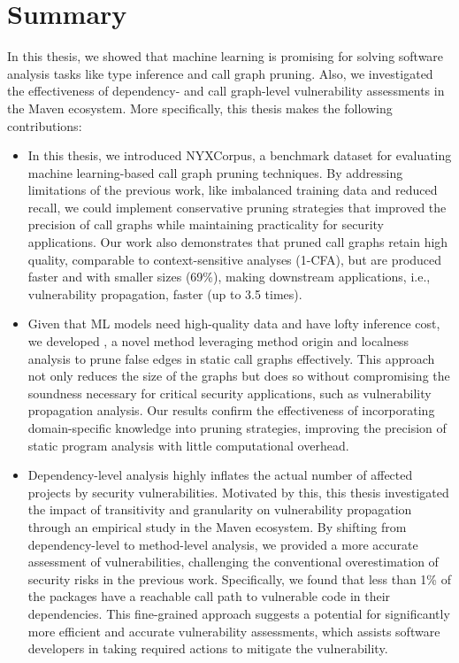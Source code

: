 \section{Summary}
In this thesis, we showed that machine learning is promising for solving software analysis tasks like type inference and call graph pruning. Also, we investigated the effectiveness of dependency- and call graph-level vulnerability assessments in the Maven ecosystem. More specifically, this thesis makes the following contributions:

\begin{itemize}
    \item In this thesis, we introduced NYXCorpus, a benchmark dataset for evaluating machine learning-based call graph pruning techniques. By addressing limitations of the previous work, like imbalanced training data and reduced recall, we could implement conservative pruning strategies that improved the precision of call graphs while maintaining practicality for security applications. Our work also demonstrates that pruned call graphs retain high quality, comparable to context-sensitive analyses (1-CFA), but are produced faster and with smaller sizes (69\%), making downstream applications, i.e., vulnerability propagation, faster (up to 3.5 times).

    \item Given that ML models need high-quality data and have lofty inference cost, we developed , a novel method leveraging method origin and localness analysis to prune false edges in static call graphs effectively. This approach not only reduces the size of the graphs but does so without compromising the soundness necessary for critical security applications, such as vulnerability propagation analysis. Our results confirm the effectiveness of incorporating domain-specific knowledge into pruning strategies, improving the precision of static program analysis with little computational overhead.

    \item Dependency-level analysis highly inflates the actual number of affected projects by security vulnerabilities. Motivated by this, this thesis investigated the impact of transitivity and granularity on vulnerability propagation through an empirical study in the Maven ecosystem. By shifting from dependency-level to method-level analysis, we provided a more accurate assessment of vulnerabilities, challenging the conventional overestimation of security risks in the previous work. Specifically, we found that less than 1\% of the packages have a reachable call path to vulnerable code in their dependencies. This fine-grained approach suggests a potential for significantly more efficient and accurate vulnerability assessments, which assists software developers in taking required actions to mitigate the vulnerability. 


\end{itemize}
